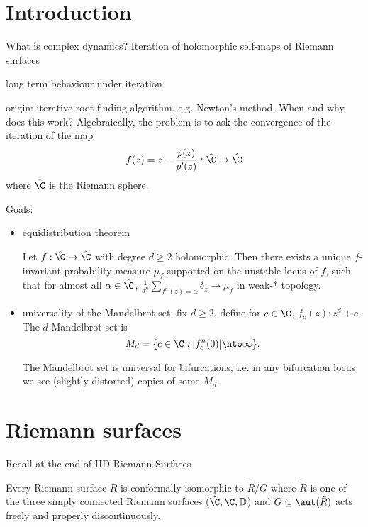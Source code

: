 \documentclass[a4paper]{article}
\newcommand{\D}{\mathbb{D}}
\begin{document}


\tableofcontents

\setcounter{section}{-1}

\section{Introduction}

What is complex dynamics? Iteration of holomorphic self-maps of Riemann surfaces

long term behaviour under iteration

origin: iterative root finding algorithm, e.g. Newton's method. When and why does this work? Algebraically, the problem is to ask the convergence of the iteration of the map
\[
  f(z) = z - \frac{p(z)}{p'(z)}: \hat \C \to \hat \C
\]
where \(\hat \C\) is the Riemann sphere.

Goals:
\begin{itemize}
\item equidistribution theorem

  \begin{theorem}
    Let \(f: \hat \C \to \hat \C\) with degree \(d \geq 2\) holomorphic.  Then there exists a unique \(f\)-invariant probability measure \(\mu_f\) supported on the unstable locus of \(f\), such that for almost all \(\alpha \in \hat \C\), \(\frac{1}{d^n} \sum_{f^n(z) = \alpha} \delta_z \to \mu_f\) in weak-* topology.
  \end{theorem}
\item universality of the Mandelbrot set: fix \(d \geq 2\), define for \(c \in \C\), \(f_c(z): z^d + c\). The \(d\)-Mandelbrot set is
  \[
    M_d = \{c \in \C: |f_c^n(0)| \nto \infty\}.
  \]

  \begin{theorem}[McMullen 1997]
    The Mandelbrot set is universal for bifurcations, i.e. in any bifurcation locus we see (slightly distorted) copics of some \(M_d\).
  \end{theorem}
\end{itemize}

\section{Riemann surfaces}

Recall at the end of IID Riemann Surfaces

\begin{theorem}[uniformisation]
  Every Riemann surface \(R\) is conformally isomorphic to \(\tilde R/G\) where \(\tilde R\) is one of the three simply connected Riemann surfaces (\(\hat \C, \C, \D\)) and \(G \subseteq \aut(\tilde R)\) acts freely and properly discontinuously.
\end{theorem}
\end{document}
